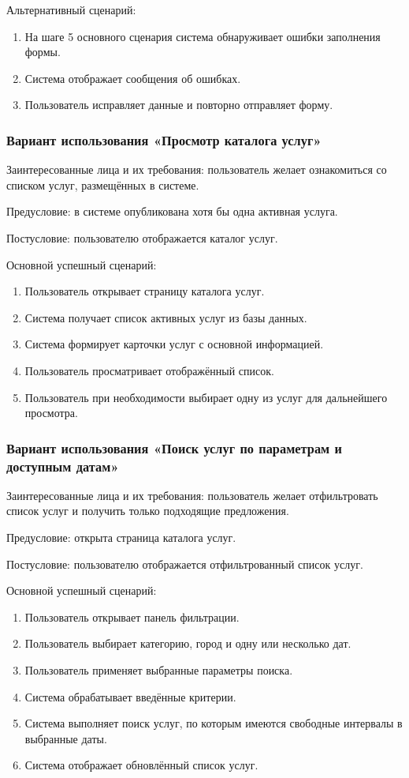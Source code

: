 Альтернативный сценарий:
\begin{enumerate}
	\item На шаге 5 основного сценария система обнаруживает ошибки заполнения формы.
	\item Система отображает сообщения об ошибках.
	\item Пользователь исправляет данные и повторно отправляет форму.
\end{enumerate}

\subsubsection{Вариант использования «Просмотр каталога услуг»}

Заинтересованные лица и их требования: пользователь желает ознакомиться со списком услуг, размещённых в системе.

Предусловие: в системе опубликована хотя бы одна активная услуга.

Постусловие: пользователю отображается каталог услуг.

Основной успешный сценарий:
\begin{enumerate}
	\item Пользователь открывает страницу каталога услуг.
	\item Система получает список активных услуг из базы данных.
	\item Система формирует карточки услуг с основной информацией.
	\item Пользователь просматривает отображённый список.
	\item Пользователь при необходимости выбирает одну из услуг для дальнейшего просмотра.
\end{enumerate}

\subsubsection{Вариант использования «Поиск услуг по параметрам и доступным датам»}

Заинтересованные лица и их требования: пользователь желает отфильтровать список услуг и получить только подходящие предложения.

Предусловие: открыта страница каталога услуг.

Постусловие: пользователю отображается отфильтрованный список услуг.

Основной успешный сценарий:
\begin{enumerate}
	\item Пользователь открывает панель фильтрации.
	\item Пользователь выбирает категорию, город и одну или несколько дат.
	\item Пользователь применяет выбранные параметры поиска.
	\item Система обрабатывает введённые критерии.
	\item Система выполняет поиск услуг, по которым имеются свободные интервалы в выбранные даты.
	\item Система отображает обновлённый список услуг.
\end{enumerate}

